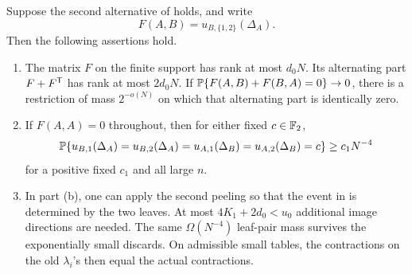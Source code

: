 \begin{lemma}
\label{lem:tiny-cover}
Suppose the second alternative of 
holds, and write
\[
 F(A,B)=u_{B,\{1,2\}}(\Delta_A).
\]
Then the following assertions hold.
\begin{enumerate}[label=\textup{(\alph*)}]
\item The matrix \(F\) on the finite support has rank at most
\(d_0N\).  Its alternating part \(F+F^{\mathsf T}\) has rank at most
\(2d_0N\).  If
\(\mathbb P\{F(A,B)+F(B,A)=0\}\to0\), there is a restriction of
mass \(2^{-o(N)}\) on which that alternating part is
identically zero.
\item If \(F(A,A)=0\) throughout, then for either fixed
\(c\in\mathbb F_2\),
\begin{equation}
 \mathbb P\{u_{B,1}(\Delta_A)=u_{B,2}(\Delta_A)
       =u_{A,1}(\Delta_B)=u_{A,2}(\Delta_B)=c\}
       \ge c_1N^{-4}
 \label{eq:tiny-four-phases}
\end{equation}
for a positive fixed \(c_1\) and all large \(n\).
\item In part \textup{(b)}, one can apply the second peeling
so that the event in  is determined
by the two leaves.  At most \(4K_1+2d_0<u_0\) additional
image directions are needed.  The same \(\Omega(N^{-4})\)
leaf-pair mass survives the exponentially small discards.
On admissible small tables, the contractions on the old
\(\lambda_i\)'s then equal the actual contractions.
\end{enumerate}
\end{lemma}

